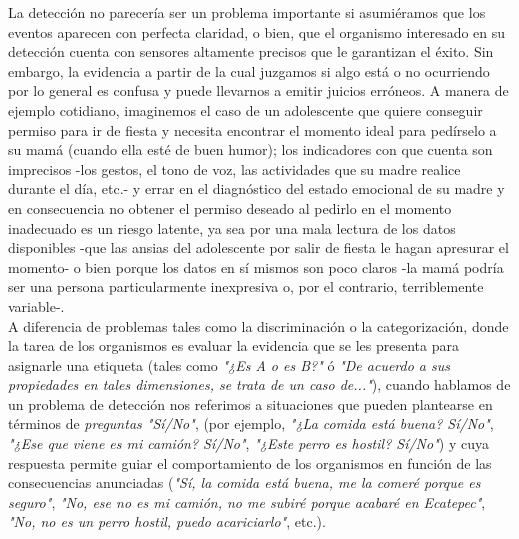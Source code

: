 La detección no parecería ser un problema importante si asumiéramos que los eventos aparecen con perfecta claridad, o bien, que el organismo interesado en su detección cuenta con sensores altamente precisos que le garantizan el éxito. Sin embargo, la evidencia a partir de la cual juzgamos si algo está o no ocurriendo por lo general es confusa y puede llevarnos a emitir juicios erróneos. A manera de ejemplo cotidiano, imaginemos el caso de un adolescente que quiere conseguir permiso para ir de fiesta y necesita encontrar el momento ideal para pedírselo a su mamá (cuando ella esté de buen humor); los indicadores con que cuenta son imprecisos -los gestos, el tono de voz, las actividades que su madre realice durante el día, etc.- y errar en el diagnóstico del estado emocional de su madre y en consecuencia no obtener el permiso deseado al pedirlo en el momento inadecuado es un riesgo latente, ya sea por una mala lectura de los datos disponibles -que las ansias del adolescente por salir de fiesta le hagan apresurar el momento- o bien porque los datos en sí mismos son poco claros -la mamá podría ser una persona particularmente inexpresiva o, por el contrario, terriblemente variable-.\\ 

A diferencia de problemas tales como la discriminación o la categorización, donde la tarea de los organismos es evaluar la evidencia que se les presenta para asignarle una etiqueta (tales como \textit{"¿Es A o es B?"} ó \textit{"De acuerdo a sus propiedades en tales dimensiones, se trata de un caso de..."}), cuando hablamos de un problema de detección nos referimos a situaciones que pueden plantearse en términos de \textit{preguntas "Sí/No"}, (por ejemplo, \textit{"¿La comida está buena? Sí/No"}, \textit{"¿Ese que viene es mi camión? Sí/No"}, \textit{"¿Este perro es hostil? Sí/No"}) y cuya respuesta permite guiar el comportamiento de los organismos en función de las consecuencias anunciadas (\textit{"Sí, la comida está buena, me la comeré porque es seguro"}, \textit{"No, ese no es mi camión, no me subiré porque acabaré en Ecatepec"}, \textit{"No, no es un perro hostil, puedo acariciarlo"}, etc.).\\ 

